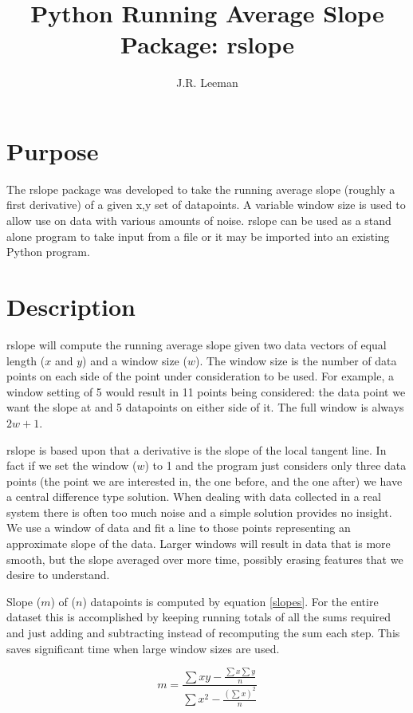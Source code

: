 \documentclass[a4paper,11pt,oneside]{article}
\author{ J.R. Leeman}
\title{Python Running Average Slope Package: rslope}
\begin{document}
\maketitle
\newpage

\section{Purpose}
The rslope package was developed to take the running average slope (roughly a first derivative) of a given x,y set of datapoints.  A variable window size is used to allow use on data with various amounts of noise.  rslope can be used as a stand alone program to take input from a file or it may be imported into an existing Python program.

\section{Description}
rslope will compute the running average slope given two data vectors of equal length ($x$ and $y$) and a window size ($w$).  The window size is the number of data points on each side of the point under consideration to be used.  For example, a window setting of 5 would result in 11 points being considered: the data point we want the slope at and 5 datapoints on either side of it.  The full window is always $2w+1$.

rslope is based upon that a derivative is the slope of the local tangent line.  In fact if we set the window ($w$) to 1 and the program just considers only three data points (the point we are interested in, the one before, and the one after) we have a central difference type solution.  When dealing with data collected in a real system there is often too much noise and a simple solution provides no insight.  We use a window of data and fit a line to those points representing an approximate slope of the data.  Larger windows will result in data that is more smooth, but the slope averaged over more time, possibly erasing features that we desire to understand.  

Slope ($m$) of ($n$) datapoints is computed by equation \ref{slopes}.  For the entire dataset this is accomplished by keeping running totals of all the sums required and just adding and subtracting instead of recomputing the sum each step.  This saves significant time when large window sizes are used.  

\begin{equation}
m = \frac{\sum{xy} - \frac{\sum{x} \sum{y}}{n}}{\sum{x^2} - \frac{\left(\sum{x}\right)^2}{n}}
\label{slopes}
\end{equation}
\end{document}
